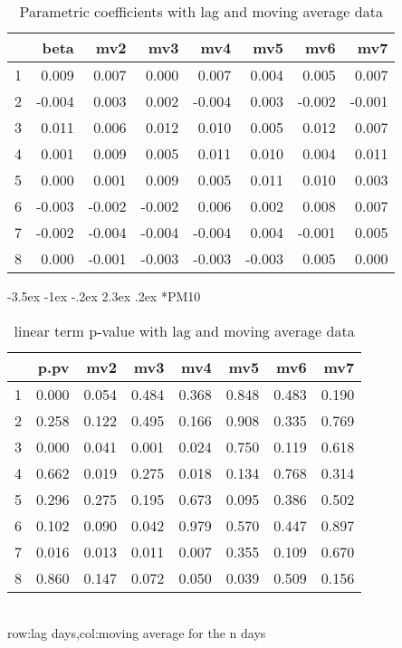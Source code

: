 \documentclass[a4paper, 12pt]{article}
\makeatletter
\def\large{\fontsize{14}{20}\selectfont}
\renewcommand\subsection{\@startsection {subsection}{1}{\z@}%
                                   {-3.5ex \@plus -1ex \@minus -.2ex}%
                                   {2.3ex \@plus.2ex}%
                                   {\centering\normalfont\large\bfseries}}
\makeatother
\begin{document}
\begin{table}[h]
\centering
\caption{Parametric coefficients with lag and moving average data}
\begin{tabular}{rrrrrrrr}
  \hline
 & beta & mv2 & mv3 & mv4 & mv5 & mv6 & mv7 \\
  \hline
1 & 0.009 & 0.007 & 0.000 & 0.007 & 0.004 & 0.005 & 0.007 \\
  2 & -0.004 & 0.003 & 0.002 & -0.004 & 0.003 & -0.002 & -0.001 \\
  3 & 0.011 & 0.006 & 0.012 & 0.010 & 0.005 & 0.012 & 0.007 \\
  4 & 0.001 & 0.009 & 0.005 & 0.011 & 0.010 & 0.004 & 0.011 \\
  5 & 0.000 & 0.001 & 0.009 & 0.005 & 0.011 & 0.010 & 0.003 \\
  6 & -0.003 & -0.002 & -0.002 & 0.006 & 0.002 & 0.008 & 0.007 \\
  7 & -0.002 & -0.004 & -0.004 & -0.004 & 0.004 & -0.001 & 0.005 \\
  8 & 0.000 & -0.001 & -0.003 & -0.003 & -0.003 & 0.005 & 0.000 \\
   \hline
\end{tabular}
\end{table}
\clearpage
\subsection*{PM10}
\begin{table}[h]
\centering
\caption{linear term p-value with lag and moving average data}
\begin{tabular}{rrrrrrrr}
  \hline
 & p.pv & mv2 & mv3 & mv4 & mv5 & mv6 & mv7 \\
  \hline
1 & 0.000 & 0.054 & 0.484 & 0.368 & 0.848 & 0.483 & 0.190 \\
  2 & 0.258 & 0.122 & 0.495 & 0.166 & 0.908 & 0.335 & 0.769 \\
  3 & 0.000 & 0.041 & 0.001 & 0.024 & 0.750 & 0.119 & 0.618 \\
  4 & 0.662 & 0.019 & 0.275 & 0.018 & 0.134 & 0.768 & 0.314 \\
  5 & 0.296 & 0.275 & 0.195 & 0.673 & 0.095 & 0.386 & 0.502 \\
  6 & 0.102 & 0.090 & 0.042 & 0.979 & 0.570 & 0.447 & 0.897 \\
  7 & 0.016 & 0.013 & 0.011 & 0.007 & 0.355 & 0.109 & 0.670 \\
  8 & 0.860 & 0.147 & 0.072 & 0.050 & 0.039 & 0.509 & 0.156 \\
   \hline
\end{tabular}
\\row:lag days,col:moving average for the n days
\end{table}
\end{document}
